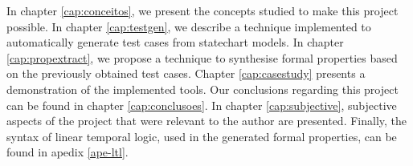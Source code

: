 In chapter \ref{cap:conceitos}, we present the concepts studied to make this project possible. In chapter \ref{cap:testgen}, we describe a technique implemented to automatically generate test cases from statechart models. In chapter \ref{cap:propextract}, we propose a technique to synthesise formal properties based on the previously obtained test cases. Chapter \ref{cap:casestudy} presents a demonstration of the implemented tools. Our conclusions regarding this project can be found in chapter \ref{cap:conclusoes}. In chapter \ref{cap:subjective}, subjective aspects of the project that were relevant to the author are presented. Finally, the syntax of linear temporal logic, used in the generated formal properties, can be found in apedix \ref{ape-ltl}.
